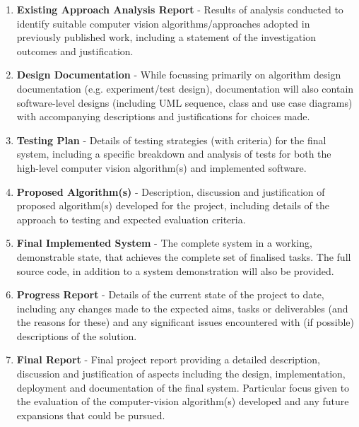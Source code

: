 \documentclass[10pt,fleqn,twoside]{article}
\begin{document}
\begin{enumerate}

	\item \textbf{Existing Approach Analysis Report} - Results of analysis conducted to identify suitable computer vision algorithms/approaches adopted in previously published work, including a statement of the investigation outcomes and justification. 

	\item \textbf{Design Documentation} - While focussing primarily on algorithm design documentation (e.g. experiment/test design), documentation will also contain software-level designs (including UML sequence, class and use case diagrams) with accompanying descriptions and justifications for choices made.

	\item \textbf{Testing Plan} - Details of testing strategies (with criteria) for the final system, including a specific breakdown and analysis of tests for both the high-level computer vision algorithm(s) and implemented software.
	 
	\item \textbf{Proposed Algorithm(s)} - Description, discussion and justification of proposed algorithm(s) developed for the project, including details of the approach to testing 	and expected evaluation criteria. 
	
	\item \textbf{Final Implemented System} - The complete system in a working, demonstrable state, that achieves the complete set of finalised tasks. The full source code, in addition to a system demonstration will also be provided.
	
	\item \textbf{Progress Report} - Details of the current state of the project to date, including any changes made to the expected aims, tasks or deliverables (and the reasons for these) and any significant issues encountered with (if possible) descriptions of the solution.

	\item \textbf{Final Report} - Final project report providing a detailed description, discussion and justification of aspects including the design, implementation, deployment and documentation of the final system. Particular focus given to the evaluation of the computer-vision algorithm(s) developed and any future expansions that could be pursued.
		


\end{enumerate}
\end{document}
